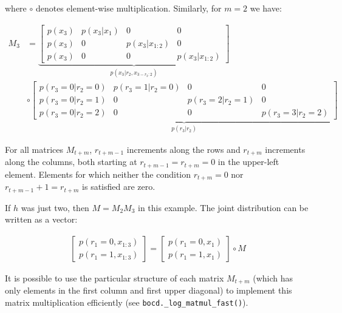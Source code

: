 \documentclass{article}
\begin{document}
where $\circ$ denotes element-wise multiplication. Similarly, for $m=2$ we have:

\begin{align}M_{3} & =\underbrace{\left[\begin{array}{cccc}
p(x_{3}) & p(x_{3}\vert x_{1}) & 0 & 0\\
p(x_{3}) & 0 & p(x_{3}\vert x_{1:2}) & 0\\
p(x_{3}) & 0 & 0 & p(x_{3}\vert x_{1:2})
\end{array}\right]}_{p(x_{3}\vert r_{2},x_{3-r_{3}:2})}\\
 & \circ\underbrace{\left[\begin{array}{cccc}
p(r_{3}=0\vert r_{2}=0) & p(r_{3}=1\vert r_{2}=0) & 0 & 0\\
p(r_{3}=0\vert r_{2}=1) & 0 & p(r_{3}=2\vert r_{2}=1) & 0\\
p(r_{3}=0\vert r_{2}=2) & 0 & 0 & p(r_{3}=3\vert r_{2}=2)
\end{array}\right]}_{p(r_{3}\vert r_{2})}
\end{align}

For all matrices $M_{t+m}$, $r_{t+m-1}$ increments along the rows and $r_{t+m}$ increments along the columns, both starting at $r_{t+m-1}=r_{t+m}=0$ in the upper-left element. Elements for which neither the condition $r_{t+m}=0$ nor $r_{t+m-1}+1=r_{t+m}$ is satisfied are zero.

If $h$ was just two, then $M=M_{2}M_{3}$ in this example. The joint distribution can be written as a vector:

\begin{align}
\left[\begin{array}{c}
p(r_{1}=0,x_{1:3})\\
p(r_{1}=1,x_{1:3})
\end{array}\right]=\left[\begin{array}{c}
p(r_{1}=0,x_{1})\\
p(r_{1}=1,x_{1})
\end{array}\right]\circ M
\end{align}

It is possible to use the particular structure of each matrix $M_{t+m}$ (which has only elements in the first column and first upper diagonal) to implement this matrix multiplication efficiently (see \texttt{bocd.\_log\_matmul\_fast()}).
\end{document}
